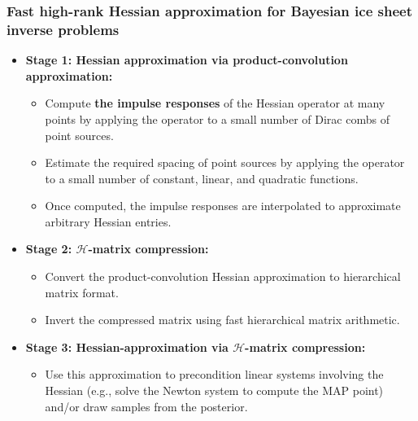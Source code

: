 \documentclass[10pt,final,xcolor=dvipsnames]{beamer}
\begin{document}
\begin{frame}
  \frametitle{Fast high-rank Hessian approximation for Bayesian ice
    sheet inverse problems}
      \begin{itemize}
      \item {\bf Stage 1: Hessian approximation via product-convolution
        approximation:}
        \begin{itemize}
        \item Compute {\bf the impulse responses} of the Hessian operator at
          many points by applying the operator to a small number of Dirac
          combs of point sources.
        \item Estimate the required spacing of point sources by applying the
          operator to a small number of constant, linear, and quadratic
          functions.
        \item Once computed, the impulse responses are interpolated to approximate arbitrary Hessian entries.
        \end{itemize}
      \item {\bf Stage 2: $\mathcal{H}$-matrix compression:}
        \begin{itemize}
        \item Convert the product-convolution Hessian approximation to
          hierarchical matrix format.
        \item Invert the compressed matrix using fast hierarchical matrix
          arithmetic.
        \end{itemize}

        \item {\bf Stage 3: Hessian-approximation via
          $\mathcal{H}$-matrix compression:}
          \begin{itemize}
            \item Use this approximation to precondition linear systems involving the Hessian (e.g., solve the Newton system to
              compute the MAP point) and/or draw samples from the
              posterior.
          \end{itemize}
      \end{itemize}
\end{frame}
\end{document}
